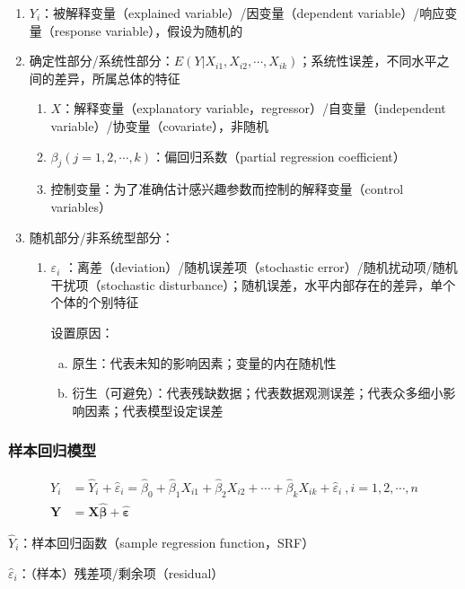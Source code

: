 \documentclass[12pt]{book}
\begin{document}
\begin{enumerate}[1.]
    \item $Y_i$：被解释变量（explained variable）/因变量（dependent variable）/响应变量（response variable），假设为随机的
    \item 确定性部分/系统性部分：$E(Y|X_{i1},X_{i2},\cdots,X_{ik})$；系统性误差，不同水平之间的差异，所属总体的特征
    \begin{enumerate}[(1)]
        \item $X$：解释变量（explanatory variable，regressor）/自变量（independent variable）/协变量（covariate），非随机
        \item $\beta_j(j=1,2,⋯,k)$：偏回归系数（partial regression coefficient） 
        \item 控制变量：为了准确估计感兴趣参数而控制的解释变量（control variables）
    \end{enumerate}
    \item 随机部分/非系统型部分：
    \begin{enumerate}[(1)]
        \item $\varepsilon_i$ ：离差（deviation）/随机误差项（stochastic error）/随机扰动项/随机干扰项（stochastic disturbance）；随机误差，水平内部存在的差异，单个个体的个别特征
        \par 设置原因：
    \begin{enumerate}[a.] 
        \item 原生：代表未知的影响因素；变量的内在随机性  
        \item 衍生（可避免）：代表残缺数据；代表数据观测误差；代表众多细小影响因素；代表模型设定误差
    \end{enumerate}
    \end{enumerate}
\end{enumerate}




\subsubsection{样本回归模型}

\begin{align*}
Y_i & ={\hat{Y}}_i+{\hat{\varepsilon}}_i ={\hat{\beta}}_0+{\hat{\beta}}_1X_{i1}+{\hat{\beta}}_2X_{i2}+\cdots+{\hat{\beta}}_kX_{ik}+{\hat{\varepsilon}}_i\ , i=1,2,\cdots,n \\  
\mathbf{Y}&=\mathbf{X}\hat{\bm{\beta}}+\hat{\bm{\varepsilon}}
\end{align*}


\par ${\hat{Y}}_i$：样本回归函数（sample regression function，SRF）
\par ${\hat{\varepsilon}}_i$：（样本）残差项/剩余项（residual）
\end{document}
